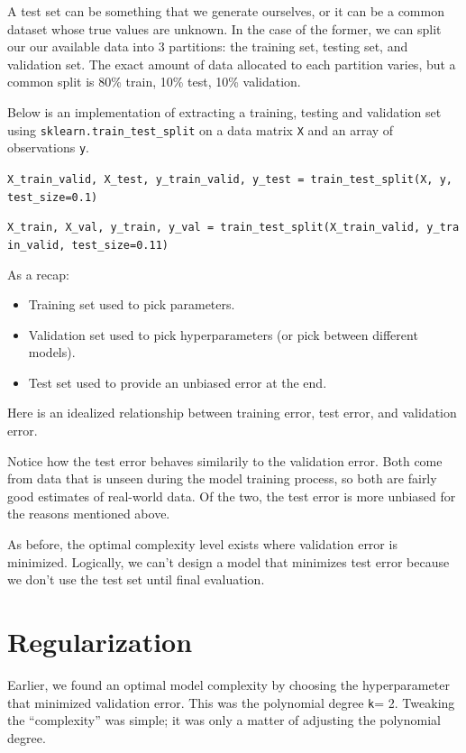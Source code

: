 \documentclass[
  letterpaper,
  DIV=11,
  numbers=noendperiod]{scrreprt}
\providecommand{\tightlist}{%
  \setlength{\itemsep}{0pt}\setlength{\parskip}{0pt}}\usepackage{longtable,booktabs,array}
\begin{document}
A test set can be something that we generate ourselves, or it can be a
common dataset whose true values are unknown. In the case of the former,
we can split our our available data into 3 partitions: the training set,
testing set, and validation set. The exact amount of data allocated to
each partition varies, but a common split is 80\% train, 10\% test, 10\%
validation.

Below is an implementation of extracting a training, testing and
validation set using \texttt{sklearn.train\_test\_split} on a data
matrix \texttt{X} and an array of observations \texttt{y}.

\texttt{X\_train\_valid,\ X\_test,\ y\_train\_valid,\ y\_test\ =\ train\_test\_split(X,\ y,\ test\_size=0.1)}

\texttt{X\_train,\ X\_val,\ y\_train,\ y\_val\ =\ train\_test\_split(X\_train\_valid,\ y\_train\_valid,\ test\_size=0.11)}

As a recap:

\begin{itemize}
\tightlist
\item
  Training set used to pick parameters.
\item
  Validation set used to pick hyperparameters (or pick between different
  models).
\item
  Test set used to provide an unbiased error at the end.
\end{itemize}

Here is an idealized relationship between training error, test error,
and validation error.

Notice how the test error behaves similarily to the validation error.
Both come from data that is unseen during the model training process, so
both are fairly good estimates of real-world data. Of the two, the test
error is more unbiased for the reasons mentioned above.

As before, the optimal complexity level exists where validation error is
minimized. Logically, we can't design a model that minimizes test error
because we don't use the test set until final evaluation.

\hypertarget{regularization}{%
\section{Regularization}\label{regularization}}

Earlier, we found an optimal model complexity by choosing the
hyperparameter that minimized validation error. This was the polynomial
degree \texttt{k}= 2. Tweaking the ``complexity'' was simple; it was
only a matter of adjusting the polynomial degree.
\end{document}
